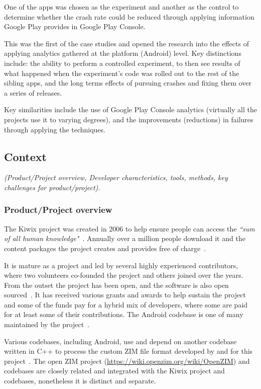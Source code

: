 One of the apps was chosen as the experiment and another as the control to determine whether the crash rate could be reduced through applying information Google Play provides in Google Play Console.

This was the first of the case studies and opened the research into the effects of applying analytics gathered at the platform (Android) level. Key distinctions include: the ability to perform a controlled experiment, to then see results of what happened when the experiment’s code was rolled out to the rest of the sibling apps, and the long terms effects of pursuing crashes and fixing them over a series of releases.

Key similarities include the use of Google Play Console analytics (virtually all the projects use it to varying degrees), and the improvements (reductions) in failures through applying the techniques. 


\subsection{Context}
\textit{(Product/Project overview, Developer characteristics, tools, methods, key challenges for product/project).}

\subsubsection{Product/Project overview}
The Kiwix project was created in 2006 to help ensure people can access the \emph{``sum of all human knowledge"}~\citep{coillet2016-wikimedia-kiwix-ten-years}. Annually over a million people download it and the content packages the project creates and provides free of charge~\citep{coillet2016-wikimedia-kiwix-ten-years}.

It is mature as a project and led by several highly experienced contributors, where two volunteers co-founded the project and others joined over the years. From the outset the project has been open, and the software is also open sourced~\citep{sutherland2014_wikimedia_on_kelson}. It has received various grants and awards to help sustain the project and some of the funds pay for a hybrid mix of developers, where some are paid for at least some of their contributions. The Android codebase is one of many maintained by the project~\citep{gaudin2017_wikimedia_kiwix_android}. 

Various codebases, including Android, use and depend on another codebase written in C++ to process the custom ZIM file format developed by and for this project~\citep{gaudin2017_wikimedia_kiwix_android}. The open ZIM project (\url{https://wiki.openzim.org/wiki/OpenZIM}) and codebases are closely related and integrated with the Kiwix project and codebases, nonetheless it is distinct and separate.

